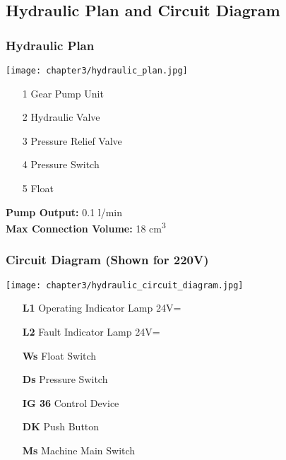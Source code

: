 
\subsection{Hydraulic Plan and Circuit Diagram}

\subsubsection*{Hydraulic Plan}

\begin{minipage}{0.65\textwidth}
    \texttt{[image: chapter3/hydraulic\_plan.jpg]}
\end{minipage}%
\begin{minipage}{0.35\textwidth}
    \begin{itemize}
        \item[1] Gear Pump Unit
        \item[2] Hydraulic Valve
        \item[3] Pressure Relief Valve
        \item[4] Pressure Switch
        \item[5] Float
    \end{itemize}
    
    \vspace{1em}
    \textbf{Pump Output:} 0.1 l/min \\
    \textbf{Max Connection Volume:} 18 cm\textsuperscript{3}
\end{minipage}

\vspace{2cm}

\subsubsection*{Circuit Diagram (Shown for 220V)}

\begin{minipage}{0.65\textwidth}
    \texttt{[image: chapter3/hydraulic\_circuit\_diagram.jpg]}
\end{minipage}%
\begin{minipage}{0.35\textwidth}
    \begin{itemize}
        \item[\textbf{L1}] Operating Indicator Lamp 24V=
        \item[\textbf{L2}] Fault Indicator Lamp 24V=
        \item[\textbf{Ws}] Float Switch
        \item[\textbf{Ds}] Pressure Switch
        \item[\textbf{IG 36}] Control Device
        \item[\textbf{DK}] Push Button
        \item[\textbf{Ms}] Machine Main Switch
    \end{itemize}
\end{minipage}

